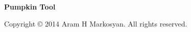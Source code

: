 \documentclass[11pt]{book}
\begin{document}

\begin{TitlePage}

\vfill
\begin{center}
\Huge
\textbf{Pumpkin Tool}
\end{center}
\vfill
{}
\medskip \noindent
\begin{center}
\sf Copyright \copyright{} 2014 Aram H Markosyan. All rights
reserved.
\end{center}
\end{TitlePage}


\begin{CopyrightPage}

\end{CopyrightPage}


\tableofcontents
\cleardoublepage
{}








\appendix







% 


%
%


\end{document}
